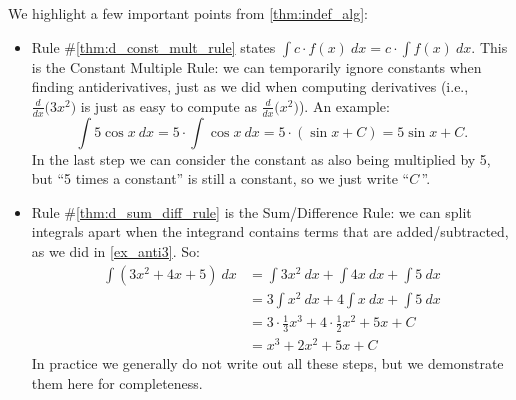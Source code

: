 We highlight a few important points from \autoref{thm:indef_alg}:
\begin{itemize}
	\item	Rule \#\ref{thm:d_const_mult_rule} states $\int c\cdot f(x)\ dx = c\cdot \int f(x)\ dx$. This is the Constant Multiple Rule:  we can temporarily ignore constants when finding antiderivatives, just as we did when computing derivatives (i.e., $\frac{d}{dx}\big(3x^2\big)$ is just as easy to compute as $\frac{d}{dx}\big(x^2\big)$). An example:
	$$\int 5\cos x\ dx = 5\cdot\int \cos x\ dx = 5\cdot (\sin x+C) = 5\sin x + C.$$
	In the last step we can consider the constant as also being multiplied by 5, but ``5 times a constant'' is still a constant, so we just write ``$C$\,''.
	\item	Rule \#\ref{thm:d_sum_diff_rule} is the Sum/Difference Rule: we can split integrals apart when the integrand contains terms that are added/subtracted, as we did in \autoref{ex_anti3}. So:
	\begin{align*}
		\int(3x^2+4x+5)\ dx
		&= \int 3x^2\ dx + \int 4x\ dx + \int 5\ dx \\
		&= 3\int x^2\ dx + 4\int x\ dx + \int 5 \ dx\\
		&= 3\cdot \frac13x^3 + 4\cdot \frac12x^2+5x+C\\
		&= x^3+2x^2+5x+C
	\end{align*}
	In practice we generally do not write out all these steps, but we demonstrate them here for completeness.
\end{itemize}

